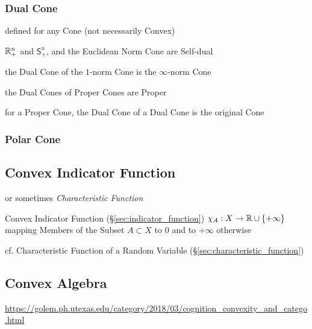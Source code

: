 \subsubsection{Dual Cone}\label{sec:dual_cone}

defined for any Cone (not necessarily Convex)

$\mathbb{R}_+^n$ and $\mathsf{S}_+^n$, and the Euclidean Norm Cone are Self-dual

the Dual Cone of the $1$-norm Cone is the $\infty$-norm Cone

the Dual Cones of Proper Cones are Proper

for a Proper Cone, the Dual Cone of a Dual Cone is the original Cone



\subsubsection{Polar Cone}\label{sec:polar_cone}



\subsection{Convex Indicator Function}\label{sec:convex_indicator_function}

or sometimes \emph{Characteristic Function}

Convex Indicator Function (\S\ref{sec:indicator_function})
$\chi_A : X \rightarrow \mathbb{R} \cup \{ +\infty \}$ mapping Members of the Subset
$A \subset X$ to $0$ and to $+\infty$ otherwise

\fist cf. Characteristic Function of a Random Variable
(\S\ref{sec:characteristic_function})



\subsection{Convex Algebra}\label{sec:convex_algebra}


\url{https://golem.ph.utexas.edu/category/2018/03/cognition_convexity_and_catego.html}



